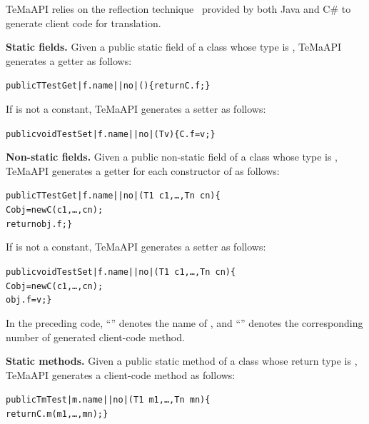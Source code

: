 TeMaAPI relies on the reflection technique~\cite{maes1987concepts} provided by both Java and C\# to generate client code for translation. 

\textbf{Static fields.} Given a public static field  of a class  whose type is , TeMaAPI generates a getter as follows:
\begin{CodeOut}%
\begin{alltt}
 public T TestGet|f.name||no|()\{ return C.f; \}
\end{alltt}
\end{CodeOut}

If  is not a constant, TeMaAPI generates a setter as follows:
\begin{CodeOut}%
\begin{alltt}
 public void TestSet|f.name||no|(T v)\{ C.f = v; \}
\end{alltt}
\end{CodeOut}

\textbf{Non-static fields.} Given a public non-static field  of a class  whose type is , TeMaAPI generates a getter for each constructor  of  as follows:
\begin{CodeOut}%
\begin{alltt}
 public T TestGet|f.name||no|(T1\ c1,\ldots, Tn\ cn)\{ 
    C obj = new C(c1,\ldots, cn);
    return obj.f; \}
\end{alltt}
\end{CodeOut}

If  is not a constant, TeMaAPI generates a setter as follows:
\begin{CodeOut}%
\begin{alltt}
 public void TestSet|f.name||no|(T1\ c1,\ldots, Tn\ cn)\{ 
   C obj = new C(c1,\ldots, cn);
   obj.f = v; \}
\end{alltt}
\end{CodeOut}

In the preceding code, ``'' denotes the name of , and ``'' denotes the corresponding number of generated client-code method.

\textbf{Static methods.} Given a public static method  of a class  whose return type is , TeMaAPI generates a client-code method as follows:
\begin{CodeOut}%
\begin{alltt}
 public Tm Test|m.name||no|(T1\ m1,\ldots, Tn\ mn)\{ 
   return C.m(m1,\ldots, mn); \}
\end{alltt}
\end{CodeOut}

